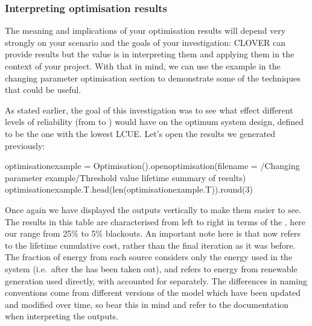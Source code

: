 \documentclass[letterpaper,10pt,english]{sphinxmanual}
\begin{document}
\subsubsection{Interpreting optimisation results}
\label{\detokenize{optimisation:interpreting-optimisation-results}}
\sphinxAtStartPar
The meaning and implications of your optimisation results will depend
very strongly on your scenario and the goals of your investigation:
CLOVER can provide results but the value is in interpreting them and
applying them in the context of your project. With that in mind, we can
use the example in the changing parameter optimisation section to
demonstrate some of the techniques that could be useful.

\sphinxAtStartPar
As stated earlier, the goal of this investigation was to see what effect
different levels of reliability (from  to
) would have on the optimum system design, defined
to be the one with the lowest LCUE. Let’s open the results we generated
previously:

\begin{sphinxVerbatim}[commandchars=\\\{\}]
optimisation\PYGZus{}example = Optimisation().open\PYGZus{}optimisation(filename = \PYGZsq{}/Changing parameter example/Threshold value lifetime summary of results\PYGZsq{})
optimisation\PYGZus{}example.T.head(len(optimisation\PYGZus{}example.T)).round(3)
\end{sphinxVerbatim}



\begin{DUlineblock}{0em}
\item[] 
\end{DUlineblock}

\sphinxAtStartPar
Once again we have displayed the outputs vertically to make them easier
to see. The results in this table are characterised from left to right
in terms of the , here our range from 25\% to 5\%
blackouts. An important note here is that  now refers to the
lifetime cumulative cost, rather than the final iteration as it was
before. The fraction of energy from each source considers only the
energy used in the system (i.e. after the  has been
taken out), and  refers to energy from renewable
generation used directly, with  accounted for
separately. The differences in naming conventions come from different
versions of the model which have been updated and modified over time, so
bear this in mind and refer to the documentation when interpreting the
outputs.
\end{document}
